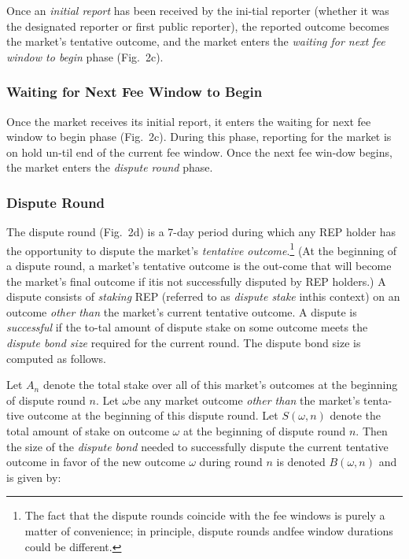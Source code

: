 \documentclass[12pt,floatfix,reprint,nofootinbib,amsmath,amssymb,epsfig,pre,floats,letterpaper,groupedaffiliation]{revtex4-1}
\theoremstyle{definition}
\theoremstyle{definition}
\begin{document}
Once an \textit{initial report} has been received by the ini-\linebreak tial reporter (whether it was the designated reporter or first public reporter), the reported outcome becomes the market's tentative outcome, and the market enters the \textit{waiting for next fee window to begin} phase (Fig.~2c).

\subsubsection{Waiting for Next Fee Window to Begin}

Once the market receives its initial report, it enters the waiting for next fee window to begin phase (Fig.~2c). During this phase, reporting for the market is on hold un-\linebreak til end of the current fee window. Once the next fee win-\linebreak dow begins, the market enters the \textit{dispute round} phase.

\subsubsection{Dispute Round}

The dispute round (Fig.~2d) is a 7-day period during which any REP holder has the opportunity to dispute the market's \textit{tentative outcome}.\footnote{The fact that the dispute rounds coincide with the fee windows is purely a matter of convenience; in principle, dispute rounds and\linebreak fee window durations could be different.} (At the beginning of a dispute round, a market's tentative outcome is the out-\linebreak come that will become the market's final outcome if it\linebreak is not successfully disputed by REP holders.) A dispute consists of \textit{staking} REP (referred to as \textit{dispute stake} in\linebreak this context) on an outcome \textit{other than} the market's current tentative outcome. A dispute is \textit{successful} if the to-\linebreak tal amount of dispute stake on some outcome meets the \textit{dispute bond size} required for the current round. The dispute bond size is computed as follows.

Let $A_n$ denote the total stake over all of this market's outcomes at the beginning of dispute round $n$. Let $\omega$\linebreak be any market outcome \textit{other than} the market's tenta-\linebreak tive outcome at the beginning of this dispute round. Let $S(\omega, n)$ denote the total amount of stake on outcome $\omega$ at the beginning of dispute round $n$. Then the size of the \textit{dispute bond} needed to successfully dispute the current tentative outcome in favor of the new outcome $\omega$ during round $n$ is denoted $B(\omega, n)$ and is given by:
\end{document}
